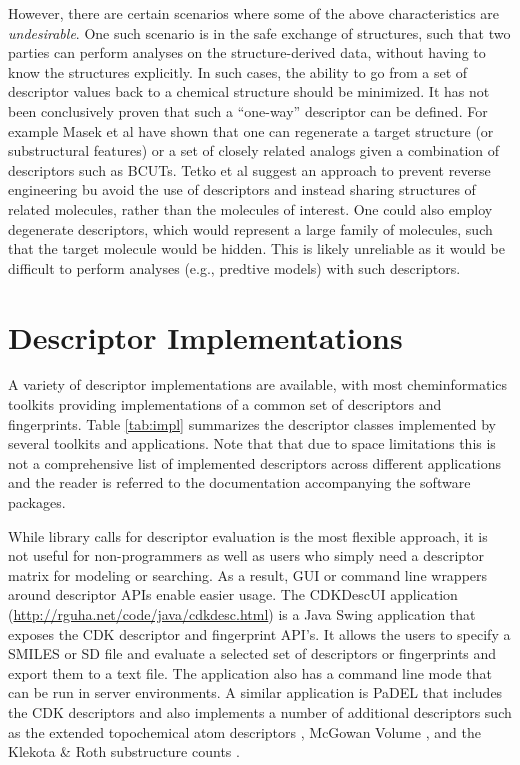 \documentclass[letterpaper, 12pt]{article}
\begin{document}
However, there are certain scenarios where some of the above
characteristics are \emph{undesirable}. One such scenario is in the
safe exchange of structures, such that two parties can perform
analyses on the structure-derived data, without having to know the
structures explicitly. In such cases, the ability to go from a set of
descriptor values back to a chemical structure should be minimized. It
has not been conclusively proven that such a ``one-way'' descriptor
can be defined. For example Masek et al \cite{Masek:2008aa} have shown
that one can regenerate a target structure (or substructural features)
or a set of closely related analogs given a combination of descriptors
such as BCUTs. Tetko et al \cite{Tetko:2005fk} suggest an approach to
prevent reverse engineering bu avoid the use of descriptors and
instead sharing structures of related molecules, rather than the
molecules of interest. One could also employ degenerate descriptors,
which would represent a large family of molecules, such that the
target molecule would be hidden. This is likely unreliable as it would
be difficult to perform analyses (e.g., predtive models) with such
descriptors.

\section{Descriptor Implementations}
\label{sec:descr-impl}

A variety of descriptor implementations are available, with most
cheminformatics toolkits providing implementations of a common set of
descriptors and fingerprints. Table \ref{tab:impl} summarizes the
descriptor classes implemented by several toolkits and
applications. Note that that due to space limitations this is not a
comprehensive list of implemented descriptors across different
applications and the reader is referred to the documentation
accompanying the software packages.

While library calls for descriptor evaluation is the most flexible
approach, it is not useful for non-programmers as well as users who
simply need a descriptor matrix for modeling or searching. As a
result, GUI or command line wrappers around descriptor APIs enable
easier usage. The CDKDescUI application
(\url{http://rguha.net/code/java/cdkdesc.html}) is a Java Swing
application that exposes the CDK descriptor and fingerprint API's. It
allows the users to specify a SMILES or SD file and evaluate a
selected set of descriptors or fingerprints and export them to a text
file. The application also has a command line mode that can be run in
server environments. A similar application is PaDEL \cite{Yap:2011fk}
that includes the CDK descriptors and also implements a number of
additional descriptors such as the extended topochemical atom
descriptors \cite{Roy:2004uq}, McGowan Volume \cite{Zhao:2003kx}, and
the Klekota \& Roth substructure counts \cite{Klekota:2008vn}.
\end{document}
